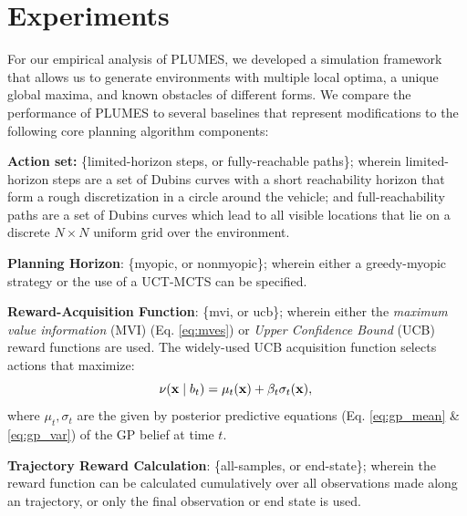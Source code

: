 \documentclass{styles/svproc}
\newcommand{\x}{\mathbf{x}}
\newenvironment{hangingpar}[1]
  {\begin{list}
          {}
          {\setlength{\itemindent}{-#1}%
           \setlength{\leftmargin}{#1}%
           \setlength{\itemsep}{0pt}%
           \setlength{\parsep}{\parskip}%
           \setlength{\topsep}{\parskip}%
           }
    \setlength{\parindent}{-#1}%
    \item[]
  }
{\end{list}}
\begin{document}
\section{Experiments}
\label{sec:experiments}
For our empirical analysis of PLUMES, we developed a simulation framework that allows us to generate environments with multiple local optima, a unique global maxima, and known obstacles of different forms. We compare the performance of PLUMES to several baselines that represent modifications to the following core planning algorithm components:

\begin{hangingpar}{2em}
 \textbf{Action set:} \{limited-horizon steps, or fully-reachable paths\}; wherein limited-horizon steps are a set of Dubins curves with a short reachability horizon that form a rough discretization in a circle around the vehicle; and full-reachability paths are a set of Dubins curves which lead to all visible locations that lie on a discrete $N \times N$ uniform grid over the environment.

\vspace{0.1cm}

\textbf{Planning Horizon}: \{myopic, or nonmyopic\}; wherein either a greedy-myopic strategy or the use of a UCT-MCTS can be specified.

\vspace{0.1cm}

\textbf{Reward-Acquisition Function}: \{mvi, or ucb\}; wherein either the \textit{maximum value information} (MVI) (Eq. \ref{eq:mves}) or \textit{Upper Confidence Bound} (UCB) reward functions are used. The widely-used UCB acquisition function selects actions that maximize:
\begin{equation}
\nu(\x \mid  b_t) = \mu_{t} (\x) + \beta_t \sigma_{t}(\x), \\
\label{eq:ucb}
\end{equation}
where $\mu_{t}, \sigma_{t}$ are the given by posterior predictive equations (Eq. \ref{eq:gp_mean} \& \ref{eq:gp_var}) of the GP belief at time $t$. 
\vspace{0.1cm}

\textbf{Trajectory Reward Calculation}: \{all-samples, or end-state\}; wherein the reward function can be calculated cumulatively over all observations made along an trajectory, or only the final observation or end state is used.
\end{hangingpar}
\end{document}
